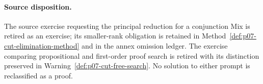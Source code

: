
\paragraph{Source disposition.}
The source exercise requesting the principal reduction for a conjunction Mix
is retired as an exercise; its smaller-rank obligation is retained in
Method~\ref{def:p07-cut-elimination-method} and in the annex omission ledger.
The exercise comparing propositional and first-order proof search is retired
with its distinction preserved in Warning~\ref{def:p07-cut-free-search}.
No solution to either prompt is reclassified as a proof.
